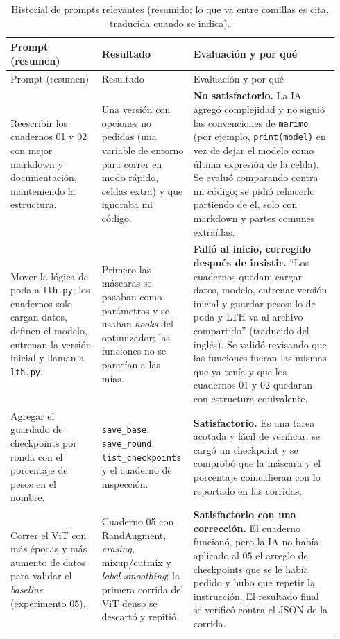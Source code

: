 \documentclass[11pt]{article}
\begin{document}
{\footnotesize
\begin{longtable}{@{}>{\raggedright\arraybackslash}p{0.27\linewidth}>{\raggedright\arraybackslash}p{0.24\linewidth}>{\raggedright\arraybackslash}p{0.43\linewidth}@{}}
\caption{Historial de prompts relevantes (resumido; lo que va entre comillas es cita, traducida cuando se indica).}\label{tab:prompts}\\
\toprule
Prompt (resumen) & Resultado & Evaluación y por qué \\
\midrule
\endfirsthead
\toprule
Prompt (resumen) & Resultado & Evaluación y por qué \\
\midrule
\endhead
Reescribir los cuadernos 01 y 02 con mejor markdown y documentación, manteniendo la estructura. & Una versión con opciones no pedidas (una variable de entorno para correr en modo rápido, celdas extra) y que ignoraba mi código. & \textbf{No satisfactorio.} La IA agregó complejidad y no siguió las convenciones de \texttt{marimo} (por ejemplo, \texttt{print(model)} en vez de dejar el modelo como última expresión de la celda). Se evaluó comparando contra mi código; se pidió rehacerlo partiendo de él, solo con markdown y partes comunes extraídas. \\
\midrule
Mover la lógica de poda a \texttt{lth.py}; los cuadernos solo cargan datos, definen el modelo, entrenan la versión inicial y llaman a \texttt{lth.py}. & Primero las máscaras se pasaban como parámetros y se usaban \textit{hooks} del optimizador; las funciones no se parecían a las mías. & \textbf{Falló al inicio, corregido después de insistir.} ``Los cuadernos quedan: cargar datos, modelo, entrenar versión inicial y guardar pesos; lo de poda y LTH va al archivo compartido'' (traducido del inglés). Se validó revisando que las funciones fueran las mismas que ya tenía y que los cuadernos 01 y 02 quedaran con estructura equivalente. \\
\midrule
Agregar el guardado de checkpoints por ronda con el porcentaje de pesos en el nombre. & \texttt{save\_base}, \texttt{save\_round}, \texttt{list\_checkpoints} y el cuaderno de inspección. & \textbf{Satisfactorio.} Es una tarea acotada y fácil de verificar: se cargó un checkpoint y se comprobó que la máscara y el porcentaje coincidieran con lo reportado en las corridas. \\
\midrule
Correr el ViT con más épocas y más aumento de datos para validar el \textit{baseline} (experimento 05). & Cuaderno 05 con RandAugment, \textit{erasing}, mixup/cutmix y \textit{label smoothing}; la primera corrida del ViT denso se descartó y repitió. & \textbf{Satisfactorio con una corrección.} El cuaderno funcionó, pero la IA no había aplicado al 05 el arreglo de checkpoints que se le había pedido y hubo que repetir la instrucción. El resultado final se verificó contra el JSON de la corrida. \\

\end{longtable}}
\end{document}
